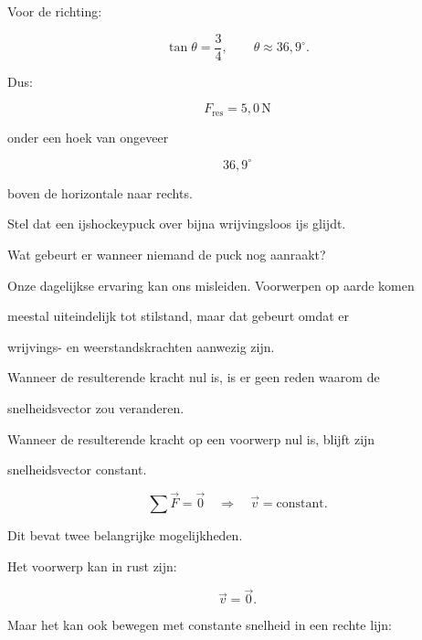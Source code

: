 \documentclass{ximera}
\begin{document}
\begin{oefening}[Resultante]{\oefB\ESS}
\begin{oplossing}
\begin{enumerate}
  Voor de richting:

  \[\tan\theta=\frac{3}{4}, \qquad \theta\approx36{,}9^\circ.\]

  Dus:

  \[\boxed{F_{\mathrm{res}}=5{,}0\,\mathrm N}\]

  onder een hoek van ongeveer

  \[\boxed{36{,}9^\circ}\]

  boven de horizontale naar rechts.

\end{enumerate}

\end{oplossing}

\end{oefening}






Stel dat een ijshockeypuck over bijna wrijvingsloos ijs glijdt.

Wat gebeurt er wanneer niemand de puck nog aanraakt?

Onze dagelijkse ervaring kan ons misleiden. Voorwerpen op aarde komen

meestal uiteindelijk tot stilstand, maar dat gebeurt omdat er

wrijvings- en weerstandskrachten aanwezig zijn.


Wanneer de resulterende kracht nul is, is er geen reden waarom de

snelheidsvector zou veranderen.


\begin{definitie}

Wanneer de resulterende kracht op een voorwerp nul is, blijft zijn

snelheidsvector constant.

\[\boxed{ \sum\vec F=\vec 0 \quad\Longrightarrow\quad \vec v=\text{constant}. }\]

\end{definitie}


Dit bevat twee belangrijke mogelijkheden.

Het voorwerp kan in rust zijn:

\[\vec v=\vec 0.\]

Maar het kan ook bewegen met constante snelheid in een rechte lijn:
\end{document}
